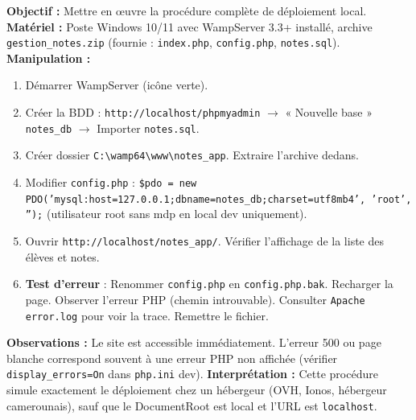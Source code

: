 \documentclass[11pt]{article}
\begin{document}
\begin{experience}
\textbf{Objectif :} Mettre en œuvre la procédure complète de déploiement local.
\textbf{Matériel :} Poste Windows 10/11 avec WampServer 3.3+ installé, archive \texttt{gestion\_notes.zip} (fournie : \texttt{index.php}, \texttt{config.php}, \texttt{notes.sql}).
\textbf{Manipulation :}
\begin{enumerate}
\item Démarrer WampServer (icône verte).
\item Créer la BDD : \texttt{http://localhost/phpmyadmin} $\rightarrow$ « Nouvelle base » \texttt{notes\_db} $\rightarrow$ Importer \texttt{notes.sql}.
\item Créer dossier \texttt{C:\textbackslash wamp64\textbackslash www\textbackslash notes\_app}. Extraire l'archive dedans.
\item Modifier \texttt{config.php} : \texttt{\$pdo = new PDO('mysql:host=127.0.0.1;dbname=notes\_db;charset=utf8mb4', 'root', '');} (utilisateur root sans mdp en local dev uniquement).
\item Ouvrir \texttt{http://localhost/notes\_app/}. Vérifier l'affichage de la liste des élèves et notes.
\item \textbf{Test d'erreur} : Renommer \texttt{config.php} en \texttt{config.php.bak}. Recharger la page. Observer l'erreur PHP (chemin introuvable). Consulter \texttt{Apache error.log} pour voir la trace. Remettre le fichier.
\end{enumerate}
\textbf{Observations :} Le site est accessible immédiatement. L'erreur 500 ou page blanche correspond souvent à une erreur PHP non affichée (vérifier \texttt{display\_errors=On} dans \texttt{php.ini} dev).
\textbf{Interprétation :} Cette procédure simule exactement le déploiement chez un hébergeur (OVH, Ionos, hébergeur camerounais), sauf que le DocumentRoot est local et l'URL est \texttt{localhost}.
\end{experience}
\end{document}
